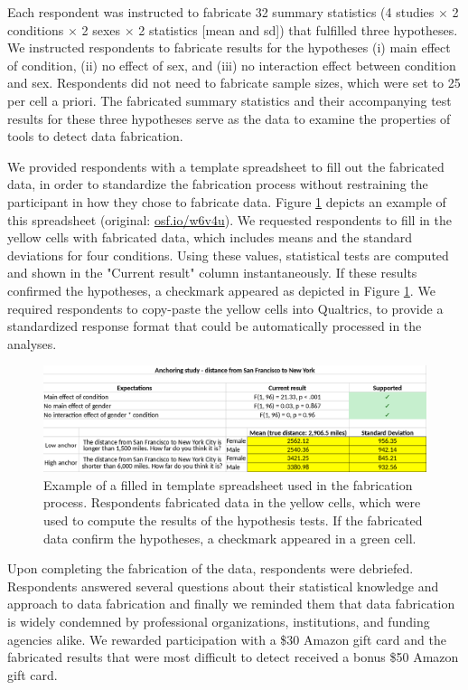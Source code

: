 \documentclass{article}
\begin{document}
Each respondent was instructed to fabricate 32 summary statistics (4 studies $\times$ 2 conditions $\times$ 2 sexes $\times$ 2 statistics [mean and sd]) that fulfilled three hypotheses. We instructed respondents to fabricate results for the hypotheses (i) main effect of condition, (ii) no effect of sex, and (iii) no interaction effect between condition and sex. Respondents did not need to fabricate sample sizes, which were set to 25 per cell a priori. The fabricated summary statistics and their accompanying test results for these three hypotheses serve as the data to examine the properties of tools to detect data fabrication.

We provided respondents with a template spreadsheet to fill out the fabricated data, in order to standardize the fabrication process without restraining the participant in how they chose to fabricate data. Figure \ref{fig1} depicts an example of this spreadsheet (original:  \url{osf.io/w6v4u}). We requested respondents to fill in the yellow cells with fabricated data, which includes means and the standard deviations for four conditions. Using these values, statistical tests are computed and shown in the "Current result" column instantaneously. If these results confirmed the hypotheses, a checkmark appeared as depicted in Figure \ref{fig1}. We required respondents to copy-paste the yellow cells into Qualtrics, to provide a standardized response format that could be automatically processed in the analyses.

\begin{figure}
\begin{center}
\includegraphics[width=\textwidth,height=\textheight,keepaspectratio]{../figures/spreadsheet.png}
\caption{Example of a filled in template spreadsheet used in the fabrication process. Respondents fabricated data in the yellow cells, which were used to compute the results of the hypothesis tests. If the fabricated data confirm the hypotheses, a checkmark appeared in a green cell.}
\label{fig1}
\end{center}
\end{figure}

Upon completing the fabrication of the data, respondents were debriefed. Respondents answered several questions about their statistical knowledge and approach to data fabrication and finally we reminded them that data fabrication is widely condemned by professional organizations, institutions, and funding agencies alike. We rewarded participation with a \$30 Amazon gift card and the fabricated results that were most difficult to detect received a bonus \$50 Amazon gift card.
\end{document}
